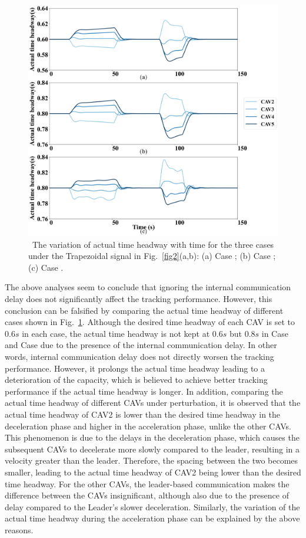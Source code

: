 \documentclass[a4paper]{cas-sc}
\begin{document}
\begin{figure}
  \centering
  \includegraphics[width=14cm]{figs/fig6.png}
  \caption{~The variation of actual time headway with time for the three cases under the Trapezoidal signal in Fig.~\ref{fig2}(a,b): (a) Case \uppercase\expandafter{}; (b) Case \uppercase\expandafter{}; (c) Case \uppercase\expandafter{}.}
  \label{fig6}
\end{figure}

The above analyses seem to conclude that ignoring the internal communication delay does not significantly affect the tracking performance. However, this conclusion can be falsified by comparing the actual time headway of different cases shown in Fig.~\ref{fig6}. Although the desired time headway of each CAV is set to $0.6s$ in each case, the actual time headway is not kept at $0.6s$ but $0.8s$ in Case \uppercase\expandafter{} and Case \uppercase\expandafter{} due to the presence of the internal communication delay. In other words, internal communication delay does not directly worsen the tracking performance. However, it prolongs the actual time headway leading to a deterioration of the capacity, which is believed to achieve better tracking performance if the actual time headway is longer. In addition, comparing the actual time headway of different CAVs under perturbation, it is observed that the actual time headway of CAV2 is lower than the desired time headway in the deceleration phase and higher in the acceleration phase, unlike the other CAVs. This phenomenon is due to the delays in the deceleration phase, which causes the subsequent CAVs to decelerate more slowly compared to the leader, resulting in a velocity greater than the leader. Therefore, the spacing between the two becomes smaller, leading to the actual time headway of CAV2 being lower than the desired time headway. For the other CAVs, the leader-based communication makes the difference between the CAVs insignificant, although also due to the presence of delay compared to the Leader's slower deceleration. Similarly, the variation of the actual time headway during the acceleration phase can be explained by the above reasons.
\end{document}
